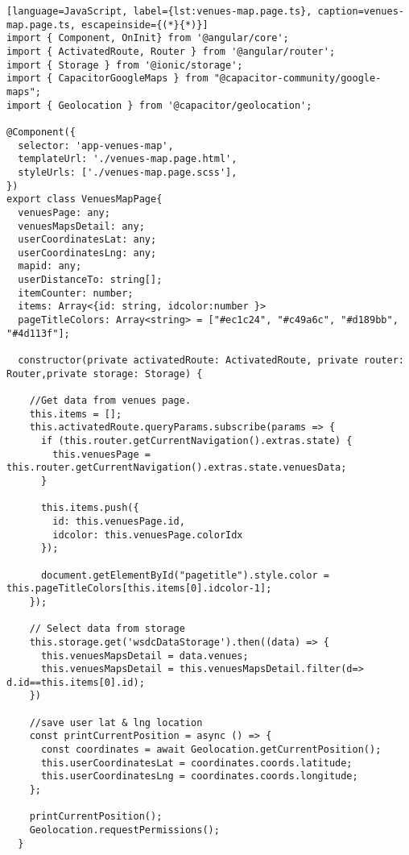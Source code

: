\begin{lstlisting}[language=JavaScript, label={lst:venues-map.page.ts}, caption=venues-map.page.ts, escapeinside={(*}{*)}]
import { Component, OnInit} from '@angular/core';
import { ActivatedRoute, Router } from '@angular/router';
import { Storage } from '@ionic/storage';
import { CapacitorGoogleMaps } from "@capacitor-community/google-maps";
import { Geolocation } from '@capacitor/geolocation';

@Component({
  selector: 'app-venues-map',
  templateUrl: './venues-map.page.html',
  styleUrls: ['./venues-map.page.scss'],
})
export class VenuesMapPage{
  venuesPage: any;
  venuesMapsDetail: any;
  userCoordinatesLat: any;
  userCoordinatesLng: any;
  mapid: any;
  userDistanceTo: string[];
  itemCounter: number;
  items: Array<{id: string, idcolor:number }>
  pageTitleColors: Array<string> = ["#ec1c24", "#c49a6c", "#d189bb", "#4d113f"];

  constructor(private activatedRoute: ActivatedRoute, private router: Router,private storage: Storage) {

    //Get data from venues page.
    this.items = [];
    this.activatedRoute.queryParams.subscribe(params => {
      if (this.router.getCurrentNavigation().extras.state) {
        this.venuesPage = this.router.getCurrentNavigation().extras.state.venuesData;
      }
      
      this.items.push({
        id: this.venuesPage.id,
        idcolor: this.venuesPage.colorIdx
      });
      
      document.getElementById("pagetitle").style.color = this.pageTitleColors[this.items[0].idcolor-1];
    });

    // Select data from storage
    this.storage.get('wsdcDataStorage').then((data) => {
      this.venuesMapsDetail = data.venues;
      this.venuesMapsDetail = this.venuesMapsDetail.filter(d=> d.id==this.items[0].id);
    })

    //save user lat & lng location
    const printCurrentPosition = async () => {
      const coordinates = await Geolocation.getCurrentPosition();
      this.userCoordinatesLat = coordinates.coords.latitude;
      this.userCoordinatesLng = coordinates.coords.longitude;
    };
    
    printCurrentPosition();
    Geolocation.requestPermissions();
  }


\end{lstlisting}
